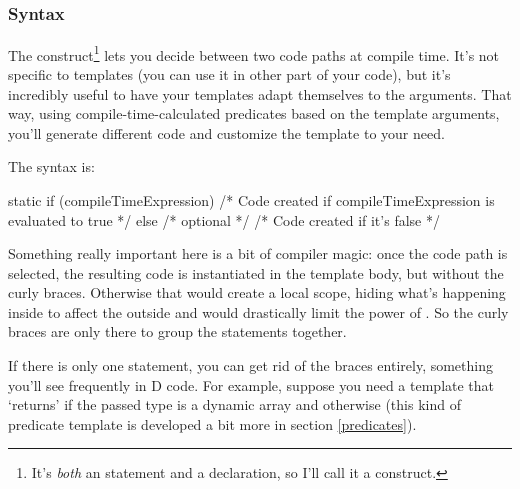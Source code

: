 
\subsection{\texorpdfstring{}
                           {static if}}
\label{staticif}

\subsubsection{Syntax}

The  construct\footnote{ It's \emph{both} an statement and a declaration, so I'll call it a construct.}
lets you decide between two code paths at compile time. It's not specific to templates (you can use it in other part of your code), but it's incredibly useful to have your templates adapt themselves to the arguments. That way, using compile-time-calculated predicates based on the template arguments, you'll generate different code and customize the template to your need.

The syntax is:
\begin{dcode}
static if (compileTimeExpression)
{
     /* Code created if compileTimeExpression is evaluated to true */
}
else /* optional */
{
     /* Code created if it's false */
}
\end{dcode}

Something really important here is a bit of compiler magic: once the code path is selected, the resulting code is instantiated in the template body, but without the curly braces. Otherwise that would create a local scope, hiding what's happening inside to affect the outside and would drastically limit the power of . So the curly braces are only there to group the statements together. 

If there is only one statement, you can get rid of the braces entirely, something you'll see frequently in D code. For example, suppose you need a template that `returns'  if the passed type is a dynamic array and  otherwise (this kind of predicate template is developed a bit more in section \ref{predicates}).

